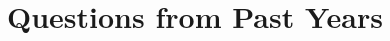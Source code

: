\documentclass[12pt,oneside]{book}
\newcommand{\abs}[1]{\left\vert#1\right\vert}
\begin{document}
    
    
    \part{Questions from Past Years}
\end{document}
